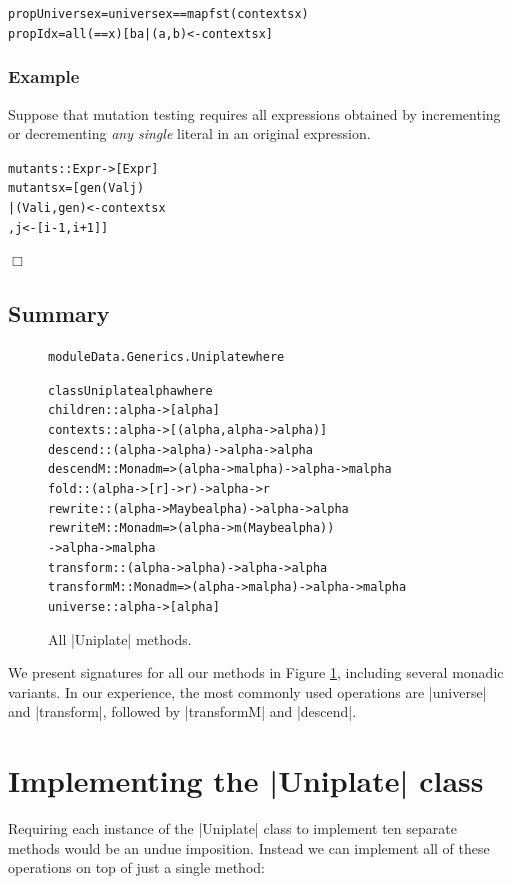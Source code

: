 \documentclass[preprint]{sigplanconf}
\newcounter{exmp}
\newcommand{\yesexample}{\subsubsection*{Example \arabic{exmp}}\refstepcounter{exmp}}
\newcommand{\noexample}{\hfill$\Box$}
\newenvironment{code}{\begin{alltt}\small}{\end{alltt}}
\newenvironment{example}{\yesexample}{\noexample}
\begin{document}
\begin{code}
propUniverse x = universe x == map fst (contexts x)
propId x = all (== x) [b a | (a,b) <- contexts x]
\end{code}

\begin{example}
Suppose that mutation testing requires all expressions obtained by incrementing or decrementing \textit{any single} literal in an original expression.

\begin{code}
mutants :: Expr -> [Expr]
mutants x =  [gen (Val j)
             | (Val i, gen) <- contexts x
             , j <- [i-1, i+1]]
\end{code}
\end{example}


\subsection{Summary}

\begin{figure}
\begin{code}
module Data.Generics.Uniplate where

class Uniplate alpha where
    children    :: alpha -> [alpha]
    contexts    :: alpha -> [(alpha, alpha -> alpha)]
    descend     :: (alpha -> alpha) -> alpha -> alpha
    descendM    :: Monad m => (alpha -> m alpha) -> alpha -> m alpha
    fold        :: (alpha -> [r] -> r) -> alpha -> r
    rewrite     :: (alpha -> Maybe alpha) -> alpha -> alpha
    rewriteM    :: Monad m  => (alpha -> m (Maybe alpha))
                                   -> alpha -> m alpha
    transform   :: (alpha -> alpha) -> alpha -> alpha
    transformM  :: Monad m => (alpha -> m alpha) -> alpha -> m alpha
    universe    :: alpha -> [alpha]
\end{code}
\caption{All |Uniplate| methods.}
\label{fig:play}
\end{figure}

We present signatures for all our methods in Figure \ref{fig:play}, including several monadic variants. In our experience, the most commonly used operations are |universe| and |transform|, followed by |transformM| and |descend|.


\section{Implementing the |Uniplate| class}
\label{sec:implement_play}

Requiring each instance of the |Uniplate| class to implement ten separate methods would be an undue imposition. Instead we can implement all of these operations on top of just a single method:
\end{document}
